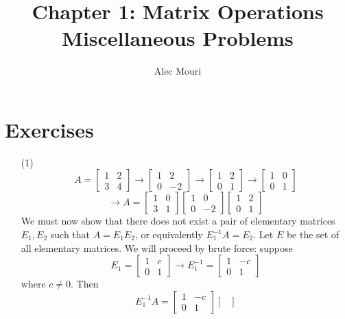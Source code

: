 \documentclass[12pt]{article}
\begin{document}
\title{Chapter 1: Matrix Operations \\ Miscellaneous Problems}
\author{Alec Mouri}

\maketitle
\section*{Exercises}
\begin{itemize}
\item[(1)]
$$A = \begin{bmatrix}
1 & 2 \\
3 & 4
\end{bmatrix} \rightarrow \begin{bmatrix}
1 & 2 \\
0 & -2
\end{bmatrix} \rightarrow \begin{bmatrix}
1 & 2 \\
0 & 1
\end{bmatrix} \rightarrow \begin{bmatrix}
1 & 0 \\
0 & 1
\end{bmatrix}$$
$$\rightarrow A = \begin{bmatrix}
1 & 0 \\
3 & 1
\end{bmatrix}\begin{bmatrix}
1 & 0 \\
0 & -2
\end{bmatrix}\begin{bmatrix}
1 & 2 \\
0 & 1
\end{bmatrix}$$
We must now show that there does not exist a pair of elementary matrices $E_1, E_2$ such that $A = E_1E_2$, or equivalently $E_1^{-1}A = E_2$. Let $E$ be the set of all elementary matrices. We will proceed by brute force: suppose 
$$E_1 = \begin{bmatrix}
1 & c \\
0 & 1
\end{bmatrix} \rightarrow E_1^{-1} = \begin{bmatrix}
1 & -c \\
0 & 1
\end{bmatrix}$$
where $c \neq 0$. Then
$$E_1^{-1}A = \begin{bmatrix}
1 & -c \\
0 & 1
\end{bmatrix}\begin{bmatrix}

\end{bmatrix}$$
\end{itemize}
\end{document}
